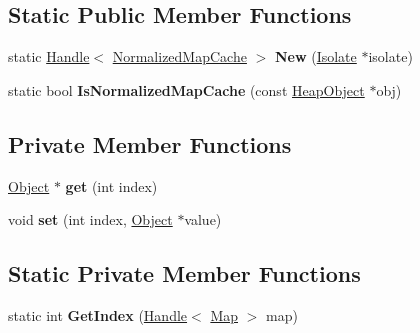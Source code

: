 \subsection*{Static Public Member Functions}
\begin{DoxyCompactItemize}
\item 
static \hyperlink{classv8_1_1internal_1_1_handle}{Handle}$<$ \hyperlink{classv8_1_1internal_1_1_normalized_map_cache}{Normalized\+Map\+Cache} $>$ {\bfseries New} (\hyperlink{classv8_1_1internal_1_1_isolate}{Isolate} $\ast$isolate)\hypertarget{classv8_1_1internal_1_1_normalized_map_cache_a0dcfd10a848e942ed4032e7855365bbe}{}\label{classv8_1_1internal_1_1_normalized_map_cache_a0dcfd10a848e942ed4032e7855365bbe}

\item 
static bool {\bfseries Is\+Normalized\+Map\+Cache} (const \hyperlink{classv8_1_1internal_1_1_heap_object}{Heap\+Object} $\ast$obj)\hypertarget{classv8_1_1internal_1_1_normalized_map_cache_a9fe7a07799b3a44e8b9612baba5ac990}{}\label{classv8_1_1internal_1_1_normalized_map_cache_a9fe7a07799b3a44e8b9612baba5ac990}

\end{DoxyCompactItemize}
\subsection*{Private Member Functions}
\begin{DoxyCompactItemize}
\item 
\hyperlink{classv8_1_1internal_1_1_object}{Object} $\ast$ {\bfseries get} (int index)\hypertarget{classv8_1_1internal_1_1_normalized_map_cache_abe36c49ad4f6859a3b6c0fdf3a72c996}{}\label{classv8_1_1internal_1_1_normalized_map_cache_abe36c49ad4f6859a3b6c0fdf3a72c996}

\item 
void {\bfseries set} (int index, \hyperlink{classv8_1_1internal_1_1_object}{Object} $\ast$value)\hypertarget{classv8_1_1internal_1_1_normalized_map_cache_a94b3cfb7f6531fa009178fd69aaa5f58}{}\label{classv8_1_1internal_1_1_normalized_map_cache_a94b3cfb7f6531fa009178fd69aaa5f58}

\end{DoxyCompactItemize}
\subsection*{Static Private Member Functions}
\begin{DoxyCompactItemize}
\item 
static int {\bfseries Get\+Index} (\hyperlink{classv8_1_1internal_1_1_handle}{Handle}$<$ \hyperlink{classv8_1_1internal_1_1_map}{Map} $>$ map)\hypertarget{classv8_1_1internal_1_1_normalized_map_cache_adc41af59025ed4f45d05a987e377096f}{}\label{classv8_1_1internal_1_1_normalized_map_cache_adc41af59025ed4f45d05a987e377096f}

\end{DoxyCompactItemize}
